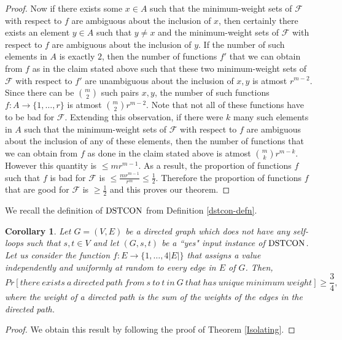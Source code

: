 \documentclass{amsbook}
\newtheorem{corollary}[theorem]{Corollary}
\theoremstyle{definition}
\theoremstyle{remark}
\numberwithin{section}{chapter}
\numberwithin{equation}{chapter}
\newcommand{\F}{\mathcal{F}}
\newcommand{\DSTCON}{\mbox{\rm DSTCON}}
\begin{document}
\begin{proof}
Now if there exists some $x\in A$ such that the minimum-weight sets of $\F$ with respect to $f$ are ambiguous about the inclusion of $x$, then certainly there exists an element $y\in A$ such that $y\neq x$ and the minimum-weight sets of $\F$ with respect to $f$ are ambiguous about the inclusion of $y$. If the number of such elements in $A$ is exactly $2$, then the number of functions $f'$ that we can obtain from $f$ as in the claim stated above such that these two minimum-weight sets of $\F$ with respect to $f'$ are unambiguous about the inclusion of $x,y$ is atmost $r^{m-2}$. Since there can be ${{m}\choose {2}}$ such pairs $x,y$, the number of such functions $f:A\rightarrow \{ 1,\ldots ,r\}$ is atmost ${{{m}\choose {2}}r^{m-2}}$. Note that not all of these functions have to be bad for $\F$. Extending this observation, if there were $k$ many such elements in $A$ such that the minimum-weight sets of $\F$ with respect to $f$ are ambiguous about the inclusion of any of these elements, then the number of functions that we can obtain from $f$ as done in the claim stated above is atmost ${{{m}\choose {k}}r^{m-k}}$. However this quantity is $\leq {mr^{m-1}}$. As a result, the proportion of functions $f$ such that $f$ is bad for $\F$ is $\leq\frac{mr^{m-1}}{r^m}\leq \frac{1}{2}$. Therefore the proportion of functions $f$ that are good for $\F$ is $\geq\frac{1}{2}$ and this proves our theorem.
\end{proof}

We recall the definition of $\DSTCON$ from Definition \ref{dstcon-defn}.
\begin{corollary}
Let $G=(V,E)$ be a directed graph which does not have any self-loops such that $s,t\in V$ and let $(G,s,t)$ be a ``yes" input instance of $\DSTCON$. Let us consider the function $f:E\rightarrow \{1,\ldots ,4|E|\}$ that assigns a value independently and uniformly at random to every edge in $E$ of $G$. Then,
\[
Pr[there~exists~a~directed~path~ from~s~to~t~in~G~that~has~unique~minimum~weight]\geq\frac{3}{4},
\]
where the weight of a directed path is the sum of the weights of the edges in the directed path.
\end{corollary}
\begin{proof}
We obtain this result by following the proof of Theorem \ref{Isolating}.
\end{proof}
\end{document}
